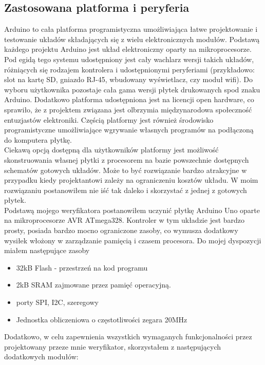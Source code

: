 \documentclass[declaration,shortabstract, mgr]{iithesis}
\begin{document}
\subsection{Zastosowana platforma i peryferia}
\indent Arduino to cała platforma programistyczna umożliwiająca łatwe projektowanie i testowanie układów składających się z wielu elektronicznych modułów. Podstawą każdego projektu Arduino jest układ elektroniczny oparty na mikroprocesorze. Pod egidą tego systemu udostępniony jest cały wachlarz wersji takich układów, różniących się rodzajem kontrolera i udostępnionymi peryferiami (przykładowo: slot na kartę SD, gniazdo RJ-45, wbudowany wyświetlacz, czy moduł wifi). Do wyboru użytkownika pozostaje cała gama wersji płytek drukowanych spod znaku Arduino. Dodatkowo platforma udostępniona jest na licencji open hardware, co sprawiło, że z projektem związana jest olbrzymia międzynarodowa społeczność entuzjastów elektroniki. Częścią platformy jest również środowisko programistyczne umożliwiające wgrywanie własnych programów na podłączoną do komputera płytkę.\\
\indent Ciekawą opcją dostępną dla użytkowników platformy jest możliwość skonstruowania własnej płytki z procesorem na bazie powszechnie dostępnych schematów gotowych układów. Może to być rozwiązanie bardzo atrakcyjne w przypadku kiedy projektantowi zależy na ograniczeniu kosztów układu. W moim rozwiązaniu postanowiłem nie iść tak daleko i skorzystać z jednej z gotowych płytek.\\
\indent Podstawą mojego weryfikatora postanowiłem uczynić płytkę Arduino Uno oparte na mikroprocesorze AVR ATmega328. Kontroler w tym układzie jest bardzo prosty, posiada bardzo mocno ograniczone zasoby, co wymusza dodatkowy wysiłek włożony w zarządzanie pamięcią i czasem procesora. Do mojej dyspozycji miałem następujące zasoby\\
\begin{itemize}
\item 32kB Flash - przestrzeń na kod programu
\item 2kB SRAM zajmowane przez pamięć operacyjną.
\item porty SPI, I2C, szeregowy
\item Jednostka obliczeniowa o częstotliwości zegara 20MHz
\end{itemize}
\indent Dodatkowo, w celu zapewnienia wszystkich wymaganych funkcjonalności przez projektowany przeze mnie weryfikator, skorzystałem z następujących dodatkowych modułów:
\end{document}
